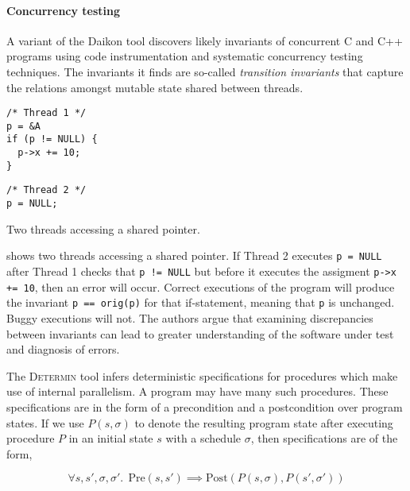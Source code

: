 \paragraph{Concurrency testing}
A variant of the Daikon tool discovers likely invariants of concurrent
C and C++ programs using code instrumentation and systematic
concurrency testing techniques\cite{kusano2015}.  The invariants it
finds are so-called \emph{transition invariants} that capture the
relations amongst mutable state shared between threads.

\begin{listing}
\centering
\begin{minipage}[t]{0.3\textwidth}
\begin{verbatim}
/* Thread 1 */
p = &A
if (p != NULL) {
  p->x += 10;
}
\end{verbatim}
\end{minipage}
\begin{minipage}[t]{0.3\textwidth}
\begin{verbatim}
/* Thread 2 */
p = NULL;
\end{verbatim}
\end{minipage}
\caption{Two threads accessing a shared pointer.}\label{lst:cthreads}
\end{listing}

 shows two threads accessing a shared pointer.  If
Thread 2 executes \verb|p = NULL| after Thread 1 checks that
\verb|p != NULL| but before it executes the assigment
\verb|p->x += 10|, then an error will occur.  Correct executions of
the program will produce the invariant \verb|p == orig(p)| for that
if-statement, meaning that \verb|p| is unchanged.  Buggy executions
will not.  The authors argue that examining discrepancies between
invariants can lead to greater understanding of the software under
test and diagnosis of errors.

The \textsc{Determin} tool\cite{burnim2010} infers deterministic
specifications for procedures which make use of internal parallelism.
A program may have many such procedures.  These specifications are in
the form of a precondition and a postcondition over program states.
If we use $P(s, \sigma)$ to denote the resulting program state after
executing procedure $P$ in an initial state $s$ with a schedule
$\sigma$, then specifications are of the form,

\[
\forall s, s', \sigma, \sigma'.~~
\mathrm{Pre}\left(s, s'\right) \implies
\mathrm{Post}\left(P\left(s,\sigma\right),P\left(s', \sigma'\right)\right)
\]

